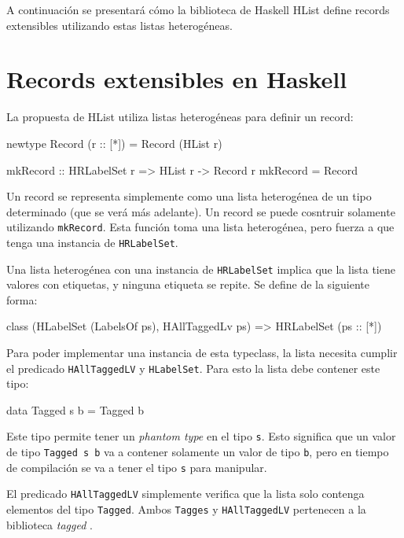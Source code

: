 A continuación se presentará cómo la biblioteca de Haskell HList define records extensibles utilizando estas listas heterogéneas.

\section{Records extensibles en Haskell}

La propuesta de HList \cite{Kiselyov:2004:STH:1017472.1017488} utiliza listas heterogéneas para definir un record:

\begin{code}
newtype Record (r :: [*]) = Record (HList r)

mkRecord :: HRLabelSet r => HList r -> Record r
mkRecord = Record
\end{code}

Un record se representa simplemente como una lista heterogénea de un tipo determinado (que se verá más adelante). Un record se puede cosntruir solamente utilizando \texttt{mkRecord}. Esta función toma una lista heterogénea, pero fuerza a que tenga una instancia de \texttt{HRLabelSet}.

Una lista heterogénea con una instancia de \texttt{HRLabelSet} implica que la lista tiene valores con etiquetas, y ninguna etiqueta se repite. Se define de la siguiente forma:

\begin{code}
class (HLabelSet (LabelsOf ps), HAllTaggedLv ps) =>
  HRLabelSet (ps :: [*])
\end{code}

Para poder implementar una instancia de esta typeclass, la lista necesita cumplir el predicado \texttt{HAllTaggedLV} y \texttt{HLabelSet}. Para esto la lista debe contener este tipo:

\begin{code}
data Tagged s b = Tagged b
\end{code}

Este tipo permite tener un \textit{phantom type} en el tipo \texttt{s}. Esto significa que un valor de tipo \texttt{Tagged s b} va a contener solamente un valor de tipo \texttt{b}, pero en tiempo de compilación se va a tener el tipo \texttt{s} para manipular.

El predicado \texttt{HAllTaggedLV} simplemente verifica que la lista solo contenga elementos del tipo \texttt{Tagged}. Ambos \texttt{Tagges} y \texttt{HAllTaggedLV} pertenecen a la biblioteca \textit{tagged} \cite{HaskellTagged}.

